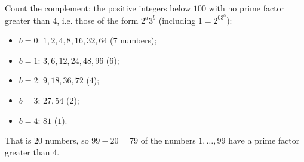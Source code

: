 Count the complement: the positive integers below $100$ with no prime factor greater than $4$, i.e. those of the form $2^a3^b$ (including $1=2^03^0$):
\begin{itemize}
\item $b=0$: $1,2,4,8,16,32,64$ ($7$ numbers);
\item $b=1$: $3,6,12,24,48,96$ ($6$);
\item $b=2$: $9,18,36,72$ ($4$);
\item $b=3$: $27,54$ ($2$);
\item $b=4$: $81$ ($1$).
\end{itemize}
That is $20$ numbers, so $99-20=\boxed{79}$ of the numbers $1,\dots,99$ have a prime factor greater than $4$.
